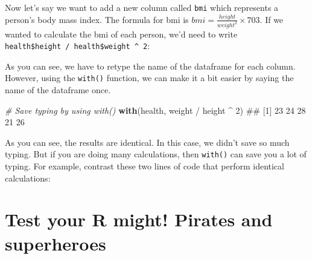 \documentclass[]{book}
\newenvironment{Shaded}{\begin{snugshade}}{\end{snugshade}}
\newcommand{\KeywordTok}[1]{\textcolor[rgb]{0.13,0.29,0.53}{\textbf{{#1}}}}
\newcommand{\DecValTok}[1]{\textcolor[rgb]{0.00,0.00,0.81}{{#1}}}
\newcommand{\StringTok}[1]{\textcolor[rgb]{0.31,0.60,0.02}{{#1}}}
\newcommand{\CommentTok}[1]{\textcolor[rgb]{0.56,0.35,0.01}{\textit{{#1}}}}
\newcommand{\NormalTok}[1]{{#1}}
\theoremstyle{definition}
\theoremstyle{definition}
\theoremstyle{remark}
\begin{document}
Now let's say we want to add a new column called \texttt{bmi} which
represents a person's body mass index. The formula for bmi is
\(bmi = \frac{height}{weight^{2}} \times 703\). If we wanted to
calculate the bmi of each person, we'd need to write
\texttt{health\$height\ /\ health\$weight\ \^{}\ 2}:

\begin{Shaded}
\end{Shaded}

As you can see, we have to retype the name of the dataframe for each
column. However, using the \texttt{with()} function, we can make it a
bit easier by saying the name of the dataframe once.

\begin{Shaded}
\begin{Highlighting}[]
\CommentTok{# Save typing by using with()}
\KeywordTok{with}\NormalTok{(health, weight /}\StringTok{ }\NormalTok{height ^}\StringTok{ }\DecValTok{2}\NormalTok{)}
\NormalTok{## [1] 23 24 28 21 26}
\end{Highlighting}
\end{Shaded}

As you can see, the results are identical. In this case, we didn't save
so much typing. But if you are doing many calculations, then
\texttt{with()} can save you a lot of typing. For example, contrast
these two lines of code that perform identical calculations:

\begin{Shaded}
\end{Shaded}

\section{Test your R might! Pirates and
superheroes}\label{test-your-r-might-pirates-and-superheroes}
\end{document}
